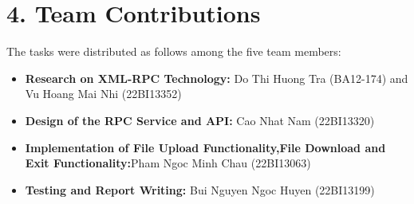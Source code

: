 \documentclass[a4paper,12pt]{article}
\begin{document}
\section*{4. Team Contributions}
The tasks were distributed as follows among the five team members:
\begin{itemize}
    \item \textbf{Research on XML-RPC Technology:} Do Thi Huong Tra (BA12-174) and Vu Hoang Mai Nhi (22BI13352)
    \item \textbf{Design of the RPC Service and API:} Cao Nhat Nam (22BI13320) 
    \item \textbf{Implementation of File Upload Functionality,File Download and Exit Functionality:}Pham Ngoc Minh Chau (22BI13063)
    \item \textbf{Testing and Report Writing:} Bui Nguyen Ngoc Huyen (22BI13199)
\end{itemize}
\end{document}
